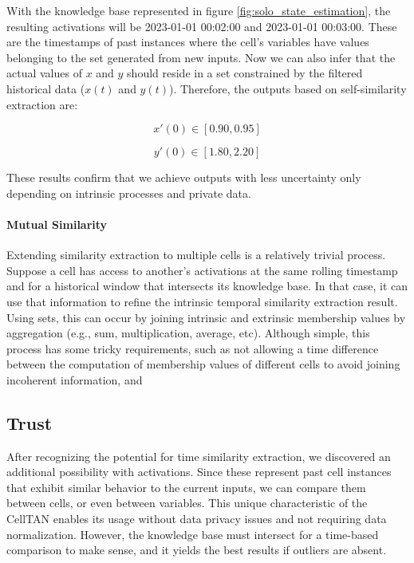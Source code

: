 With the knowledge base represented in figure \ref{fig:solo_state_estimation}, the resulting activations will be 2023-01-01 00:02:00 and 2023-01-01 00:03:00. These are the timestamps of past instances where the cell's variables have values belonging to the set generated from new inputs. Now we can also infer that the actual values of $x$ and $y$ should reside in a set constrained by the filtered historical data ($x(t)$ and $y(t)$). Therefore, the outputs based on self-similarity extraction are:

\begin{equation}
    x'(0) \in [0.90, 0.95]
\end{equation}

\begin{equation}
    y'(0) \in [1.80, 2.20]
\end{equation}

These results confirm that we achieve outputs with less uncertainty only depending on intrinsic processes and private data.

\paragraph{Mutual Similarity}

Extending similarity extraction to multiple cells is a relatively trivial process. Suppose a cell has access to another's activations at the same rolling timestamp and for a historical window that intersects its knowledge base. In that case, it can use that information to refine the intrinsic temporal similarity extraction result. Using sets, this can occur by joining intrinsic and extrinsic membership values by aggregation (e.g., sum, multiplication, average, etc).
Although simple, this process has some tricky requirements, such as not allowing a time difference between the computation of membership values of different cells to avoid joining incoherent information, and 


\subsection{Trust}  \label{subsec:trust}


After recognizing the potential for time similarity extraction, we discovered an additional possibility with activations. Since these represent past cell instances that exhibit similar behavior to the current inputs, we can compare them between cells, or even between variables. This unique characteristic of the CellTAN enables its usage without data privacy issues and not requiring data normalization. However, the knowledge base must intersect for a time-based comparison to make sense, and it yields the best results if outliers are absent.

